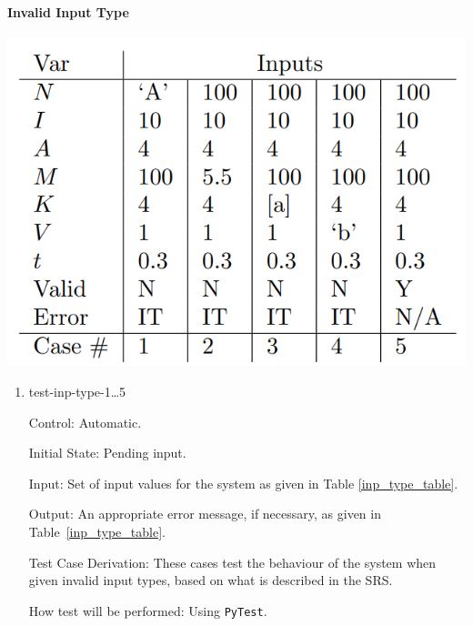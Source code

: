 \documentclass[12pt, titlepage]{article}
\begin{document}
\paragraph{Invalid Input Type}
\begin{center}
  \includegraphics[scale=0.5]{InvTypeTable.PNG} \\
  \label{inp_type_table}
\end{center}

\begin{enumerate}

  \item{test-inp-type-1\dots5\\}
  
  Control: Automatic.
            
  Initial State: Pending input.
            
  Input: Set of input values for the system as given in Table \ref{inp_type_table}.
            
  Output: An appropriate error message, if necessary, as given in Table~\ref{inp_type_table}.
  
  Test Case Derivation: These cases test the behaviour of the system when given invalid input types, based on what is described in the SRS.
            
  How test will be performed: Using \texttt{PyTest}. 
\end{enumerate}

\newpage
\end{document}
